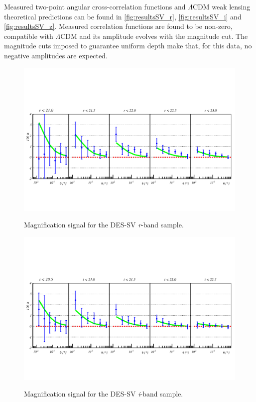 Measured two-point angular cross-correlation functions and $\Lambda$CDM weak lensing theoretical predictions can be found in \autoref{fig:resultsSV_r}, \autoref{fig:resultsSV_i} and \autoref{fig:resultsSV_z}. Measured correlation functions are found to be non-zero, compatible with $\Lambda$CDM and its amplitude evolves with the magnitude cut. The magnitude cuts imposed to guarantee uniform depth make that, for this data, no negative amplitudes are expected.
\begin{figure}
\includegraphics[width=\textwidth,trim={0 2.3cm 0 3.5cm},clip]{./figures/mag_r.pdf}
\label{fig:resultsSV_r}
\caption{Magnification signal for the DES-SV {\it r}-band sample.}
\end{figure}
\begin{figure}
\includegraphics[width=\textwidth,trim={0 2.3cm 0 3.5cm},clip]{./figures/mag_i.pdf}
\label{fig:resultsSV_i}
\caption{Magnification signal for the DES-SV {\it i}-band sample.}
\end{figure}

